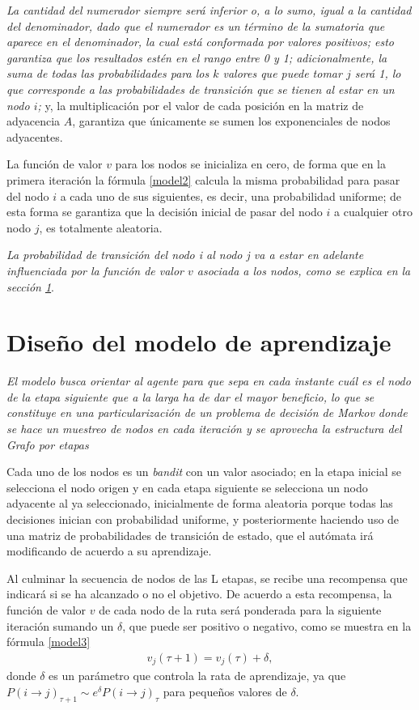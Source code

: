 \textit{La cantidad del numerador siempre será inferior o, a lo sumo, igual a la cantidad del denominador, dado que el numerador es un término de la sumatoria que aparece en el denominador, la cual está conformada por valores positivos; esto garantiza que los resultados estén en el rango entre 0 y 1; adicionalmente, la suma de todas las probabilidades para los $k$ valores que puede tomar $j$ será 1, lo que corresponde a las probabilidades de transición que se tienen al estar en un nodo $i$;} y, la multiplicación por el valor de cada posición en la matriz de adyacencia $A$, garantiza que únicamente se sumen los exponenciales de nodos adyacentes.

La función de valor $v$ para los nodos se inicializa en cero, de forma que en la primera iteración la fórmula \ref{model2} calcula la misma probabilidad para pasar del nodo $i$ a cada uno de sus siguientes, es decir, una probabilidad uniforme; de esta forma se garantiza que la decisión inicial de pasar del nodo $i$ a cualquier otro nodo $j$, es totalmente aleatoria. 

\textit{La probabilidad de transición del nodo i al nodo j va a estar en adelante influenciada por la función de valor $v$ asociada a los nodos, como se explica en la sección \ref{aprende}}.

\section{Diseño del modelo de aprendizaje} 
\label{aprende}

\textit{El modelo busca orientar al agente para que sepa en cada instante cuál es el nodo de la etapa siguiente que a la larga ha de dar el mayor beneficio, lo que se constituye en una particularización de un problema de decisión de Markov donde se hace un muestreo de nodos en cada iteración y se aprovecha la estructura del Grafo por etapas}

Cada uno de los nodos es un \textit{bandit} con un valor asociado; en la etapa inicial se selecciona el nodo origen y en cada etapa siguiente se selecciona un nodo adyacente al ya seleccionado, inicialmente de forma aleatoria porque todas las decisiones inician con probabilidad uniforme, y posteriormente haciendo uso de una matriz de probabilidades de transición de estado, que el autómata irá modificando de acuerdo a su aprendizaje.

Al culminar la secuencia de nodos de las L etapas, se recibe una recompensa que indicará si se ha alcanzado o no el objetivo. De acuerdo a esta recompensa, la función de valor $v$ de cada nodo de la ruta será ponderada para la siguiente iteración sumando un $\delta$, que puede ser positivo o negativo, como se muestra en la fórmula \ref{model3}
\begin{eqnarray}\label{model3}
v_j(\tau + 1) = v_j(\tau) + \delta,
\end{eqnarray}
donde $\delta$ es un parámetro que controla la rata de aprendizaje, ya que $P(i \to j)_{\tau+1} \sim e^{\delta} P(i \to j)_{\tau}$ para pequeños valores de $\delta$.

